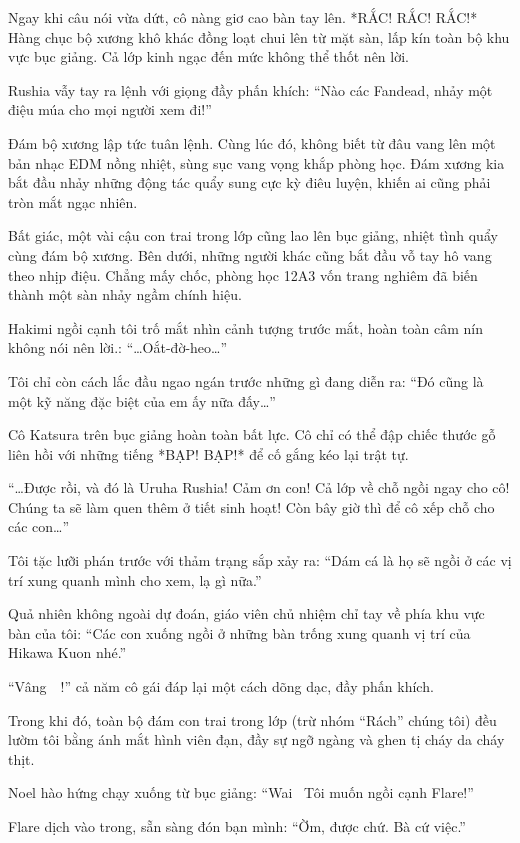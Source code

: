 \documentclass[../main.tex]{subfiles}
\begin{document}
Ngay khi câu nói vừa dứt, cô nàng giơ cao bàn tay lên. *RẮC! RẮC! RẮC!* Hàng chục bộ xương khô khác đồng loạt chui lên từ mặt sàn, lấp kín toàn bộ khu vực bục giảng. Cả lớp kinh ngạc đến mức không thể thốt nên lời.

Rushia vẫy tay ra lệnh với giọng đầy phấn khích: ``Nào các Fandead, nhảy một điệu múa cho mọi người xem đi!''

Đám bộ xương lập tức tuân lệnh. Cùng lúc đó, không biết từ đâu vang lên một bản nhạc EDM nồng nhiệt, sùng sục vang vọng khắp phòng học. Đám xương kia bắt đầu nhảy những động tác quẩy sung cực kỳ điêu luyện, khiến ai cũng phải tròn mắt ngạc nhiên.

Bất giác, một vài cậu con trai trong lớp cũng lao lên bục giảng, nhiệt tình quẩy cùng đám bộ xương. Bên dưới, những người khác cũng bắt đầu vỗ tay hô vang theo nhịp điệu. Chẳng mấy chốc, phòng học 12A3 vốn trang nghiêm đã biến thành một sàn nhảy ngầm chính hiệu.

Hakimi ngồi cạnh tôi trố mắt nhìn cảnh tượng trước mắt, hoàn toàn câm nín không nói nên lời.: ``\dots Oắt-đờ-heo\dots''

Tôi chỉ còn cách lắc đầu ngao ngán trước những gì đang diễn ra: ``Đó cũng là một kỹ năng đặc biệt của em ấy nữa đấy\dots''

Cô Katsura trên bục giảng hoàn toàn bất lực. Cô chỉ có thể đập chiếc thước gỗ liên hồi với những tiếng *BẠP! BẠP!* để cố gắng kéo lại trật tự.

``\dots Được rồi, và đó là Uruha Rushia! Cảm ơn con! Cả lớp về chỗ ngồi ngay cho cô! Chúng ta sẽ làm quen thêm ở tiết sinh hoạt! Còn bây giờ thì để cô xếp chỗ cho các con\dots''

Tôi tặc lưỡi phán trước với thảm trạng sắp xảy ra: ``Dám cá là họ sẽ ngồi ở các vị trí xung quanh mình cho xem, lạ gì nữa.''

Quả nhiên không ngoài dự đoán, giáo viên chủ nhiệm chỉ tay về phía khu vực bàn của tôi: ``Các con xuống ngồi ở những bàn trống xung quanh vị trí của Hikawa Kuon nhé.''

``Vâng~~!'' cả năm cô gái đáp lại một cách dõng dạc, đầy phấn khích.

Trong khi đó, toàn bộ đám con trai trong lớp (trừ nhóm ``Rách'' chúng tôi) đều lườm tôi bằng ánh mắt hình viên đạn, đầy sự ngỡ ngàng và ghen tị cháy da cháy thịt.

Noel hào hứng chạy xuống từ bục giảng: ``Wai~ Tôi muốn ngồi cạnh Flare!''

Flare dịch vào trong, sẵn sàng đón bạn mình: ``Ờm, được chứ. Bà cứ việc.''
\end{document}

